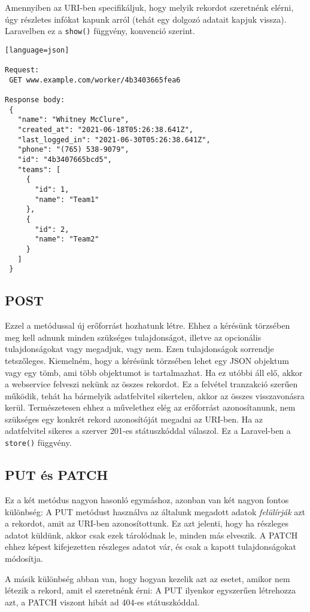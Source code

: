 \documentclass[a4paper,12pt]{thesis-ekf}
\theoremstyle{definition}
\begin{document}
				Amennyiben az URI-ben specifikáljuk, hogy melyik rekordot szeretnénk elérni, úgy részletes infókat kapunk arról (tehát egy dolgozó adatait kapjuk vissza). Laravelben ez a \verb|show()| függvény, konvenció szerint.
\begin{lstlisting}[caption={Példa a READ metódusra}][language=json]

Request:
 GET www.example.com/worker/4b3403665fea6
 
Response body:
 {
   "name": "Whitney McClure",
   "created_at": "2021-06-18T05:26:38.641Z",
   "last_logged_in": "2021-06-30T05:26:38.641Z",
   "phone": "(765) 538-9079",
   "id": "4b3407665bcd5",
   "teams": [
     {
       "id": 1,
       "name": "Team1"
     },
     {
       "id": 2,
       "name": "Team2"
     }
   ]
 }
\end{lstlisting}

			\subsection{POST}
				Ezzel a metódussal új erőforrást hozhatunk létre. Ehhez a kérésünk törzsében meg kell adnunk minden szükséges tulajdonságot, illetve az opcionális tulajdonságokat vagy megadjuk, vagy nem. Ezen tulajdonságok sorrendje tetszőleges. Kiemelném, hogy a kérésünk törzsében lehet egy JSON objektum vagy egy tömb, ami több objektumot is tartalmazhat. Ha ez utóbbi áll elő, akkor a webservice felveszi nekünk az összes rekordot. Ez a felvétel tranzakció szerűen működik, tehát ha bármelyik adatfelvitel sikertelen, akkor az összes visszavonásra kerül. Természetesen ehhez a művelethez elég az erőforrást azonosítanunk, nem szükséges egy konkrét rekord azonosítóját megadni az URI-ben. Ha az adatfelvitel sikeres a szerver 201-es státuszkóddal válaszol. Ez a Laravel-ben a \verb|store()| függvény.
				
			\subsection{PUT és PATCH}
				Ez a két metódus nagyon hasonló egymáshoz, azonban van két nagyon fontos különbség: A PUT metódust használva az általunk megadott adatok \emph{felülírják} azt a rekordot, amit az URI-ben azonosítottunk. Ez azt jelenti, hogy ha részleges adatot küldünk, akkor csak ezek tárolódnak le, minden más elveszik. A PATCH ehhez képest kifejezetten részleges adatot vár, és csak a kapott tulajdonságokat módosítja. 
				
				A másik különbség abban van, hogy hogyan kezelik azt az esetet, amikor nem létezik a rekord, amit el szeretnénk érni: A PUT ilyenkor egyszerűen létrehozza azt, a PATCH viszont hibát ad 404-es státuszkóddal.
				
\end{document}
